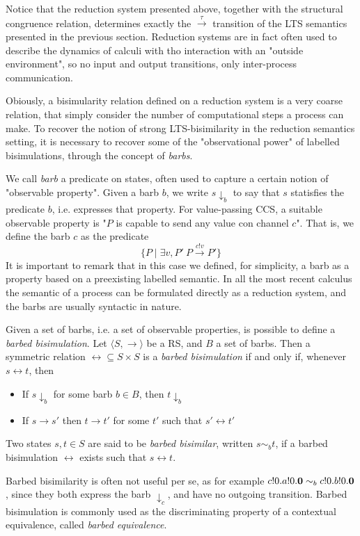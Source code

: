 Notice that the reduction system presented above, together with the structural congruence relation, determines exactly the $\xrightarrow{\tau}$ transition of the LTS semantics presented in the previous section. Reduction systems are in fact often used to describe the dynamics of calculi with tho interaction with an "outside environment", so no input and output transitions, only inter-process communication.


Obiously, a bisimularity relation defined on a reduction system is a very coarse relation, that simply consider the number of computational steps a process can make. To recover the notion of strong LTS-bisimilarity in the reduction semantics setting, it is necessary to recover some of the "observational power" of labelled bisimulations, through the concept of \textit{barbs}.

We call \textit{barb} a predicate on states, often used to capture a certain notion of "observable property". Given a barb $b$, we write $s\downarrow_b$ to say that $s$ statisfies the predicate $b$, i.e. expresses that property. For value-passing CCS, a suitable observable property is "$P$ is capable to send any value con channel $c$". That is, we define the barb $c$ as the predicate 
\[\{P \mid \exists v, P' \ P \xrightarrow{c!v} P'\}\]
It is important to remark that in this case we defined, for simplicity, a barb as a property based on a preexisting labelled semantic. In all the most recent calculus the semantic of a process can be formulated directly as a reduction system, and the barbs are usually syntactic in nature.

Given a set of barbs, i.e. a set of observable properties, is possible to define a \textit{barbed bisimulation}.
Let $\langle S , \rightarrow \rangle$ be a RS, and $B$ a set of barbs. Then a symmetric relation $\rel \subseteq S \times S$ is a \textit{barbed bisimulation} if and only if, whenever $s \rel t$, then 
\begin{itemize}
\item If $s \downarrow_b$ for some barb $b \in B$, then $t \downarrow_b$
\item If $s \rightarrow s'$ then $t \rightarrow t'$ for some $t'$ such that $s' \rel t'$
\end{itemize}
Two states $s, t \in S$ are said to be \textit{barbed bisimilar}, written $s \sim_b t$, if a barbed bisimulation $\rel$ exists such that $s \rel t$.

Barbed bisimilarity is often not useful per se, as for example $c!0.a!0.\mathbf{0} \sim_b c!0.b!0.\mathbf{0}$, since they both express the barb $\downarrow_c$, and have no outgoing transition. Barbed bisimulation is commonly used as the discriminating property of a contextual equivalence, called \textit{barbed equivalence}.

